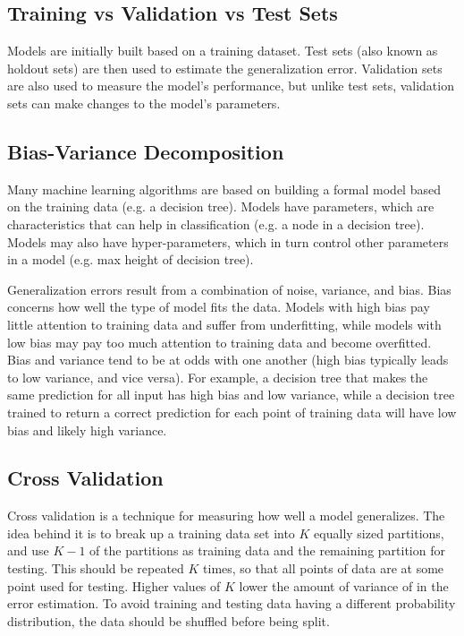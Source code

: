 \documentclass[12pt,titlepage]{article}
\begin{document}
    \subsection{Training vs Validation vs Test Sets}
      Models are initially built based on a training dataset. Test sets (also known as holdout sets) are then used to estimate the generalization
      error. Validation sets are also used to measure the model's performance, but unlike test sets, validation sets can make changes to the model's
      parameters.

    \subsection{Bias-Variance Decomposition}
      Many machine learning algorithms are based on building a formal model based on the training data (e.g. a decision tree). Models have
      parameters, which are characteristics that can help in classification (e.g. a node in a decision tree). Models may also have hyper-parameters,
      which in turn control other parameters in a model (e.g. max height of decision tree).

      Generalization errors result from a combination of noise, variance, and bias. Bias concerns how well the type of model fits the data. Models
      with high bias pay little attention to training data and suffer from underfitting, while models with low bias may pay too much attention to
      training data and become overfitted. Bias and variance tend to be at odds with one another (high bias typically leads to low variance, and vice
      versa). For example, a decision tree that makes the same prediction for all input has high bias and low variance, while a decision tree trained
      to return a correct prediction for each point of training data will have low bias and likely high variance.

    \subsection{Cross Validation}
      Cross validation is a technique for measuring how well a model generalizes. The idea behind it is to break up a training data set into $K$
      equally sized partitions, and use $K-1$ of the partitions as training data and the remaining partition for testing. This should be repeated
      $K$ times, so that all points of data are at some point used for testing. Higher values of $K$ lower the amount of variance of in the error
      estimation. To avoid training and testing data having a different probability distribution, the data should be shuffled before being split.
\end{document}
